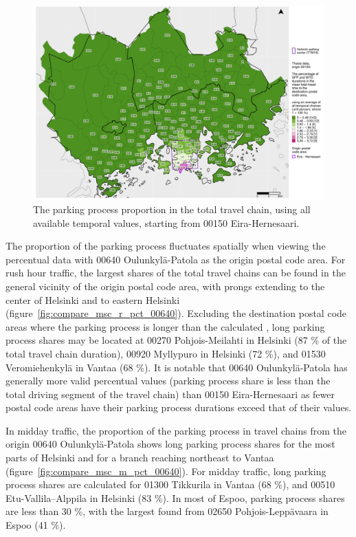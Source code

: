 \begin{figure}
    \centering
    \includegraphics[trim={0.9cm 0.3cm 0.25cm 0.3cm},clip,width=\textwidth]{images/compare_traveltimes_mapfill-msc_all_pct_fromzip-00150_28-09-2020.png}
    \caption[Parking process proportion from Eira-Hernesaari, all temporal values]{The parking process proportion in the total travel chain, using all available temporal values, starting from 00150 Eira-Hernesaari.}%
    \label{fig:compare_msc_all_pct_00150}%
\end{figure}
\restoregeometry

The proportion of the parking process fluctuates spatially when viewing the percentual data with 00640 Oulunkylä-Patola as the origin postal code area. For rush hour traffic, the largest shares of the total travel chains can be found in the general vicinity of the origin postal code area, with prongs extending to the center of Helsinki and to eastern Helsinki (figure~\ref{fig:compare_msc_r_pct_00640}). Excluding the destination postal code areas where the parking process is longer than the calculated , long parking process shares may be located at 00270 Pohjois-Meilahti in Helsinki (87 \% of the total travel chain duration), 00920 Myllypuro in Helsinki (72 \%), and 01530 Veromiehenkylä in Vantaa (68 \%). It is notable that 00640 Oulunkylä-Patola has generally more valid percentual values (parking process share is less than the total driving segment of the travel chain) than 00150 Eira-Hernesaari as fewer postal code areas have their parking process durations exceed that of their  values.

In midday traffic, the proportion of the parking process in travel chains from the origin 00640 Oulunkylä-Patola shows long parking process shares for the most parts of Helsinki and for a branch reaching northeast to Vantaa (figure~\ref{fig:compare_msc_m_pct_00640}). For midday traffic, long parking process shares are calculated for 01300 Tikkurila in Vantaa (68 \%), and 00510 Etu-Vallila--Alppila in Helsinki (83 \%). In most of Espoo, parking process shares are less than 30 \%, with the largest found from 02650 Pohjois-Leppävaara in Espoo (41 \%).

